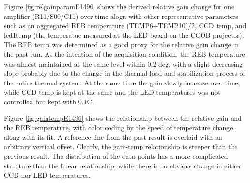 Figure \ref{fig:relgainparamE1496} shows the derived 
 relative gain change for one amplifier (R11/S00/C11) over time alogn with other representative parameters such as an aggregated REB temperature (TEMP6+TEMP10)/2, CCD temp, and led1temp (the temperatue measured at the LED board on the CCOB projector). The REB temp was determined as a good proxy for the relative gain change in the past run.
 As the intention of the acquisition condition, the REB temperature was almost maintained at the same level within 0.2 deg, with a slight decreasing slope probably due to the change in the thermal load and stabilization process of the entire thermal system.
 At the same time the gain slowly increase over time, while CCD temp is kept at the same and the LED temperatures was not controlled but kept with 0.1C.

 Figure \ref{fig:gaintempE1496} shows the relationship between the relative gain and the REB temperature, with color coding by the speed of temperature change, along with its fit. A reference line from the past result is overlaid with an arbitrary vertical offset. Clearly, the gain-temp relationship is steeper than the previous result. The distribution of the data points has a more complicated structure than the linear relationship, while there is no obvious change in either CCD nor LED temperatures. 



